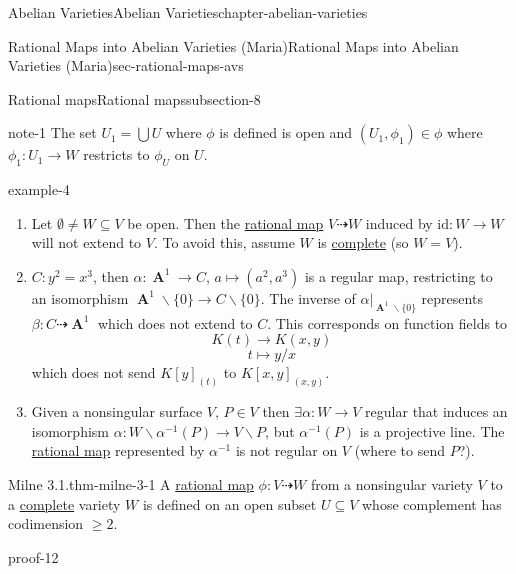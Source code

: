 \documentclass[oneside,10pt,]{book}
\numberwithin{equation}{section}
\newcommand{\id}{\mathrm{id}}
\DeclareMathOperator{\aff}{\mathbf{A}}
\begin{document}
\begin{chapterptx}{Abelian Varieties}{}{Abelian Varieties}{}{}{chapter-abelian-varieties}
\begin{sectionptx}{Rational Maps into Abelian Varieties (Maria)}{}{Rational Maps into Abelian Varieties (Maria)}{}{}{sec-rational-maps-avs}
\begin{subsectionptx}{Rational maps}{}{Rational maps}{}{}{subsection-8}
\begin{note}{}{note-1}%
\hypertarget{p-85}{}%
The set \(U_1 = \bigcup U\) where  \(\phi\) is defined is open and \((U_1,\phi_1) \in \phi\) where \(\phi_1 \colon U_1 \to W\) restricts to \(\phi_U\) on \(U\).%
\end{note}
\begin{example}{}{example-4}%
\hypertarget{p-86}{}%
\leavevmode%
\begin{enumerate}
\item\hypertarget{li-18}{}Let \(\emptyset \ne W \subseteq V\) be open. Then the \hyperref[def-rational-map]{rational map} \(V\dashrightarrow W\) induced by \(\id \colon W \to W\) will not extend to \(V\). To avoid this, assume \(W \) is \hyperref[def-abelian-complete-var]{complete} (so \(W = V\)).%
\item\hypertarget{li-19}{}\(C \colon y^2 = x^3\), then \(\alpha\colon \aff^1 \to C\), \(a\mapsto (a^2,a^3)\) is a regular map, restricting to an isomorphism  \(\aff^1 \smallsetminus \{0 \} \to C \smallsetminus \{0\}\). The inverse of \(\alpha|_{\aff^1\smallsetminus \{0\}}\) represents \(\beta \colon C \dashrightarrow \aff^1\) which does not extend to \(C\). This corresponds on function fields to%
\begin{equation*}
K(t) \to K(x,y)
\end{equation*}
%
\begin{equation*}
t\mapsto y/x
\end{equation*}
which does not send \(K[y]_{(t)}\) to \(K[x,y]_{(x,y)}\).%
\item\hypertarget{li-20}{}Given a nonsingular surface \(V,\, P\in V\) then \(\exists \alpha\colon W \to V\) regular that induces an isomorphism \(\alpha\colon W\smallsetminus \alpha^{-1} (P) \to V\smallsetminus P\), but \(\alpha^{-1}(P)\) is a projective line. The \hyperref[def-rational-map]{rational map} represented by \(\alpha^{-1}\) is not regular on \(V\) (where to send \(P\)?).%
\end{enumerate}
%
\end{example}
\begin{theorem}{Milne 3.1.}{}{thm-milne-3-1}%
\hypertarget{p-87}{}%
A \hyperref[def-rational-map]{rational map} \(\phi\colon V\dashrightarrow W\) from a nonsingular variety \(V\) to a \hyperref[def-abelian-complete-var]{complete} variety \(W\) is defined on an open subset  \(U \subseteq V\) whose complement has codimension \(\ge 2\).%
\end{theorem}
\begin{proofptx}{}{proof-12}
\hypertarget{p-88}{}%

\end{proofptx}
\end{subsectionptx}
\end{sectionptx}
\end{chapterptx}
\end{document}
